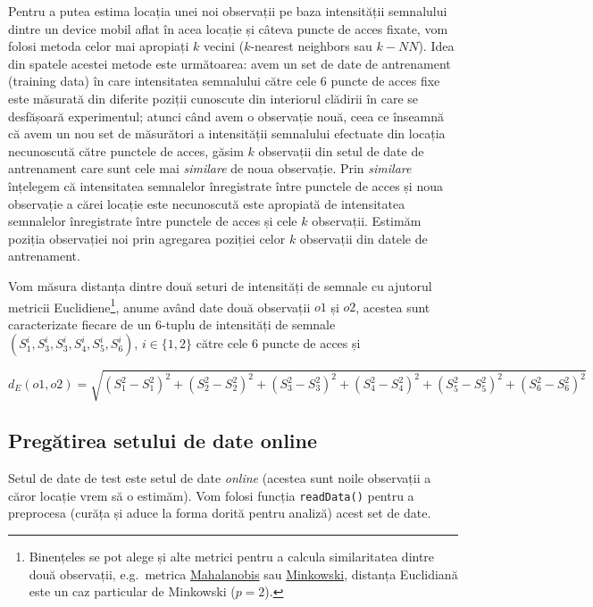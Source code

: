 \documentclass[]{article}
\let\rmarkdownfootnote\footnote%
\def\footnote{\protect\rmarkdownfootnote}
\begin{document}
Pentru a putea estima locația unei noi observații pe baza intensității
semnalului dintre un device mobil aflat în acea locație și câteva puncte
de acces fixate, vom folosi metoda celor mai apropiați \(k\) vecini
(\(k\)-nearest neighbors sau \(k-NN\)). Idea din spatele acestei metode
este următoarea: avem un set de date de antrenament (training data) în
care intensitatea semnalului către cele 6 puncte de acces fixe este
măsurată din diferite poziții cunoscute din interiorul clădirii în care
se desfășoară experimentul; atunci când avem o observație nouă, ceea ce
înseamnă că avem un nou set de măsurători a intensității semnalului
efectuate din locația necunoscută către punctele de acces, găsim \(k\)
observații din setul de date de antrenament care sunt cele mai
\emph{similare} de noua observație. Prin \emph{similare} înțelegem că
intensitatea semnalelor înregistrate între punctele de acces și noua
observație a cărei locație este necunoscută este apropiată de
intensitatea semnalelor înregistrate între punctele de acces și cele
\(k\) observații. Estimăm poziția observației noi prin agregarea
poziției celor \(k\) observații din datele de antrenament.

Vom măsura distanța dintre două seturi de intensități de semnale cu
ajutorul metricii Euclidiene\footnote{Binențeles se pot alege și alte
  metrici pentru a calcula similaritatea dintre două observații,
  e.g.~metrica
  \href{https://en.wikipedia.org/wiki/Mahalanobis_distance}{Mahalanobis}
  sau
  \href{https://en.wikipedia.org/wiki/Minkowski_distance}{Minkowski},
  distanța Euclidiană este un caz particular de Minkowski (\(p=2\)).},
anume având date două observații \(o1\) și \(o2\), acestea sunt
caracterizate fiecare de un 6-tuplu de intensități de semnale
\((S_1^i,S_3^i, S_3^i,S_4^i, S_5^i, S_6^i)\), \(i\in\{1,2\}\) către cele
6 puncte de acces și

\[
  d_E(o1,o2) = \sqrt{(S_1^2-S_1^2)^2 + (S_2^2-S_2^2)^2 + (S_3^2-S_3^2)^2 + (S_4^2-S_4^2)^2 + (S_5^2-S_5^2)^2 + (S_6^2-S_6^2)^2}
\]

\subsection{Pregătirea setului de date
online}\label{pregatirea-setului-de-date-online}

Setul de date de test este setul de date \emph{online} (acestea sunt
noile observații a căror locație vrem să o estimăm). Vom folosi funcția
\texttt{readData()} pentru a preprocesa (curăța și aduce la forma dorită
pentru analiză) acest set de date.
\end{document}
